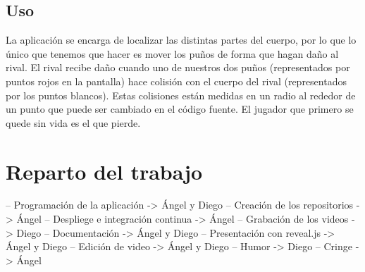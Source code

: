 \documentclass{article}
\begin{document}
\subsection{Uso}
La aplicación se encarga de localizar las distintas partes del cuerpo, por lo que lo único que tenemos que hacer es mover los puños de forma que hagan daño al rival. El rival recibe daño cuando uno de nuestros dos puños (representados por puntos rojos en la pantalla) hace colisión con el cuerpo del rival (representados por los puntos blancos). Estas colisiones están medidas en un radio al rededor de un punto que puede ser cambiado en el código fuente. El jugador que primero se quede sin vida es el que pierde.

\section{Reparto del trabajo}
\label{section:work}
-- Programación de la aplicación -> Ángel y Diego
-- Creación de los repositorios -> Ángel
-- Despliege e integración continua -> Ángel
-- Grabación de los videos -> Diego
-- Documentación -> Ángel y Diego
-- Presentación con reveal.js -> Ángel y Diego
-- Edición de video -> Ángel y Diego
-- Humor -> Diego
-- Cringe -> Ángel
\end{document}
